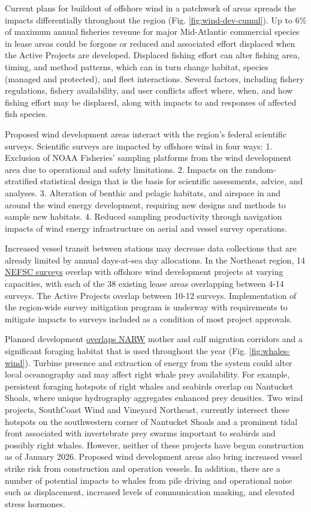 \documentclass[
  10pt,
]{article}
\begin{document}
Current plans for buildout of offshore wind in a patchwork of areas spreads the impacts differentially throughout the region (Fig. \ref{fig:wind-dev-cumul}). Up to 6\% of maximum annual fisheries revenue for major Mid-Atlantic commercial species in lease areas could be forgone or reduced and associated effort displaced when the Active Projects are developed. Displaced fishing effort can alter fishing area, timing, and method patterns, which can in turn change habitat, species (managed and protected), and fleet interactions. Several factors, including fishery regulations, fishery availability, and user conflicts affect where, when, and how fishing effort may be displaced, along with impacts to and responses of affected fish species.

Proposed wind development areas interact with the region's federal scientific surveys. Scientific surveys are impacted by offshore wind in four ways:
1. Exclusion of NOAA Fisheries' sampling platforms from the wind development area due to operational and safety limitations.
2. Impacts on the random-stratified statistical design that is the basis for scientific assessments, advice, and analyses.
3. Alteration of benthic and pelagic habitats, and airspace in and around the wind energy development, requiring new designs and methods to sample new habitats.
4. Reduced sampling productivity through navigation impacts of wind energy infrastructure on aerial and vessel survey operations.

Increased vessel transit between stations may decrease data collections that are already limited by annual days-at-sea day allocations. In the Northeast region, 14 \href{https://noaa-edab.github.io/catalog/osw_survey_impact.html}{NEFSC surveys} overlap with offshore wind development projects at varying capacities, with each of the 38 existing lease areas overlapping between 4-14 surveys. The Active Projects overlap between 10-12 surveys. Implementation of the region-wide survey mitigation program is underway with requirements to mitigate impacts to surveys included as a condition of most project approvals.

Planned development \href{https://noaa-edab.github.io/catalog/persistent_hotspots.html}{overlaps NARW} mother and calf migration corridors and a significant foraging habitat that is used throughout the year (Fig. \ref{fig:whales-wind}). Turbine presence and extraction of energy from the system could alter local oceanography and may affect right whale prey availability. For example, persistent foraging hotspots of right whales and seabirds overlap on Nantucket Shoals, where unique hydrography aggregates enhanced prey densities. Two wind projects, SouthCoast Wind and Vineyard Northeast, currently intersect these hotspots on the southwestern corner of Nantucket Shoals and a prominent tidal front associated with invertebrate prey swarms important to seabirds and possibly right whales. However, neither of these projects have begun construction as of January 2026. Proposed wind development areas also bring increased vessel strike risk from construction and operation vessels. In addition, there are a number of potential impacts to whales from pile driving and operational noise such as displacement, increased levels of communication masking, and elevated stress hormones.
\end{document}

